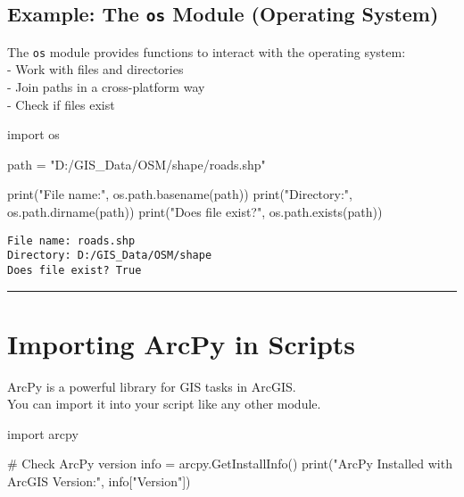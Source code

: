 \documentclass[
  11pt,
  letterpaper,
]{book}
\newenvironment{Shaded}{\begin{snugshade}}{\end{snugshade}}
\newcommand{\BuiltInTok}[1]{\textcolor[rgb]{0.00,0.23,0.31}{#1}}
\newcommand{\CommentTok}[1]{\textcolor[rgb]{0.37,0.37,0.37}{#1}}
\newcommand{\ImportTok}[1]{\textcolor[rgb]{0.00,0.46,0.62}{#1}}
\newcommand{\NormalTok}[1]{\textcolor[rgb]{0.00,0.23,0.31}{#1}}
\newcommand{\OperatorTok}[1]{\textcolor[rgb]{0.37,0.37,0.37}{#1}}
\newcommand{\StringTok}[1]{\textcolor[rgb]{0.13,0.47,0.30}{#1}}
\begin{document}
\subsection{\texorpdfstring{Example: The \texttt{os} Module (Operating
System)}{Example: The os Module (Operating System)}}\label{example-the-os-module-operating-system}

The \texttt{os} module provides functions to interact with the operating
system:\\
- Work with files and directories\\
- Join paths in a cross-platform way\\
- Check if files exist

\begin{Shaded}
\begin{Highlighting}[]
\ImportTok{import}\NormalTok{ os}

\NormalTok{path }\OperatorTok{=} \StringTok{"D:/GIS\_Data/OSM/shape/roads.shp"}

\BuiltInTok{print}\NormalTok{(}\StringTok{"File name:"}\NormalTok{, os.path.basename(path))}
\BuiltInTok{print}\NormalTok{(}\StringTok{"Directory:"}\NormalTok{, os.path.dirname(path))}
\BuiltInTok{print}\NormalTok{(}\StringTok{"Does file exist?"}\NormalTok{, os.path.exists(path))}
\end{Highlighting}
\end{Shaded}

\begin{verbatim}
File name: roads.shp
Directory: D:/GIS_Data/OSM/shape
Does file exist? True
\end{verbatim}

\begin{center}\rule{0.5\linewidth}{0.5pt}\end{center}

\section{Importing ArcPy in Scripts}\label{importing-arcpy-in-scripts}

ArcPy is a powerful library for GIS tasks in ArcGIS.\\
You can import it into your script like any other module.

\begin{Shaded}
\begin{Highlighting}[]
\ImportTok{import}\NormalTok{ arcpy}

\CommentTok{\# Check ArcPy version}
\NormalTok{info }\OperatorTok{=}\NormalTok{ arcpy.GetInstallInfo()}
\BuiltInTok{print}\NormalTok{(}\StringTok{"ArcPy Installed with ArcGIS Version:"}\NormalTok{, info[}\StringTok{"Version"}\NormalTok{])}
\end{Highlighting}
\end{Shaded}
\end{document}
